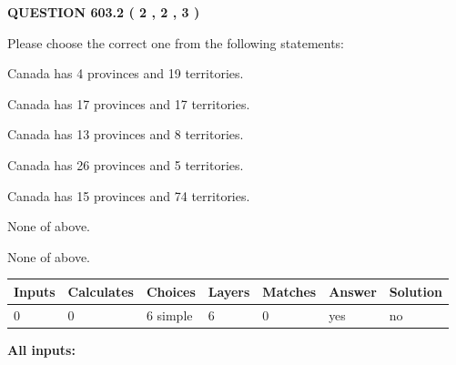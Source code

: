\documentclass[12pt]{article}
\begin{document}
   
  
\vspace{0.2in}
  
{\textbf{\Large{QUESTION
603.2 
 ( 2 , 2 , 3 )
}}}
  
  
Please choose the correct one from the following statements:
 
 
Canada has   4 provinces and  19 territories.
 
 
Canada has  17 provinces and  17 territories.
 
 
Canada has  13 provinces and  8 territories.
 
 
Canada has  26 provinces and  5 territories.
 
 
Canada has  15 provinces and  74 territories.
 
 
 None of above.
 
 
\noindent{}
 
 
 None of above.
 
 
\noindent{}
 
 
   
   
   
   
\noindent\begin{tabular}{|l|l|l|l|l|l|l|}
 \hline
Inputs & Calculates & Choices & Layers & Matches & Answer & Solution \\ \hline
 0  & 
 0  & 
 6
  simple  
  & 
 6  & 
 0  & 
  yes & 
  no 
  \\ \hline
 \end{tabular}
   
   
   
   
\noindent{}
   
   
   
   
\noindent\vspace{0.1in}\hspace{-0.08in} {\textbf{\Large{All inputs: }}}
   
   
   
   
   
   
 \vspace{0.2in}
 
\end{document}
